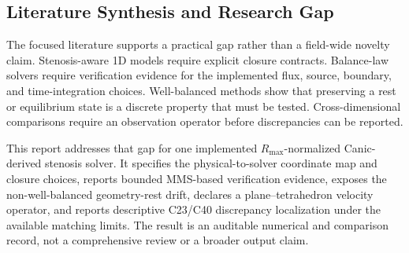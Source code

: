 \subsection{Literature Synthesis and Research Gap}
\label{subsec:literature-synthesis-gap}

The focused literature supports a practical gap rather than a field-wide novelty
claim. Stenosis-aware 1D models require explicit closure contracts. Balance-law
solvers require verification evidence for the implemented flux, source, boundary,
and time-integration choices. Well-balanced methods show that preserving a rest
or equilibrium state is a discrete property that must be tested. Cross-dimensional
comparisons require an observation operator before discrepancies can be reported.

This report addresses that gap for one implemented $R_{\max}$-normalized
Canic-derived stenosis solver. It specifies the physical-to-solver coordinate map
and closure choices, reports bounded MMS-based verification evidence, exposes the
non-well-balanced geometry-rest drift, declares a plane--tetrahedron velocity
operator, and reports descriptive C23/C40 discrepancy localization under the
available matching limits. The result is an auditable numerical and comparison
record, not a comprehensive review or a broader output claim.
